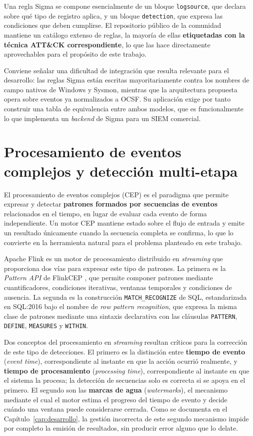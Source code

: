 Una regla Sigma se compone esencialmente de un bloque \texttt{logsource}, que declara sobre
qué tipo de registro aplica, y un bloque \texttt{detection}, que expresa las condiciones que
deben cumplirse. El repositorio público de la comunidad mantiene un catálogo extenso de
reglas, la mayoría de ellas \textbf{etiquetadas con la técnica ATT\&CK correspondiente}, lo
que las hace directamente aprovechables para el propósito de este trabajo.

Conviene señalar una dificultad de integración que resulta relevante para el desarrollo: las
reglas Sigma están escritas mayoritariamente contra los nombres de campo nativos de Windows
y Sysmon, mientras que la arquitectura propuesta opera sobre eventos ya normalizados a OCSF.
Su aplicación exige por tanto construir una tabla de equivalencia entre ambos modelos, que
es funcionalmente lo que implementa un \textit{backend} de Sigma para un SIEM comercial.

\section{Procesamiento de eventos complejos y detección multi-etapa}
\label{sec:cep}

El procesamiento de eventos complejos (CEP) es el paradigma que permite expresar y detectar
\textbf{patrones formados por secuencias de eventos} relacionados en el tiempo, en lugar de
evaluar cada evento de forma independiente. Un motor CEP mantiene estado sobre el flujo de
entrada y emite un resultado únicamente cuando la secuencia completa se confirma, lo que lo
convierte en la herramienta natural para el problema planteado en este trabajo.

Apache Flink \cite{flink} es un motor de procesamiento distribuido en \textit{streaming} que
proporciona dos vías para expresar este tipo de patrones. La primera es la
\textit{Pattern API} de FlinkCEP \cite{flinkcep}, que permite componer patrones mediante
cuantificadores, condiciones iterativas, ventanas temporales y condiciones de ausencia. La
segunda es la construcción \texttt{MATCH\_RECOGNIZE} de SQL, estandarizada en SQL:2016 bajo
el nombre de \textit{row pattern recognition}, que expresa la misma clase de patrones
mediante una sintaxis declarativa con las cláusulas \texttt{PATTERN}, \texttt{DEFINE},
\texttt{MEASURES} y \texttt{WITHIN}.

Dos conceptos del procesamiento en \textit{streaming} resultan críticos para la corrección
de este tipo de detecciones. El primero es la distinción entre \textbf{tiempo de evento}
(\textit{event time}), correspondiente al instante en que la acción ocurrió realmente, y
\textbf{tiempo de procesamiento} (\textit{processing time}), correspondiente al instante en
que el sistema la procesa; la detección de secuencias solo es correcta si se apoya en el
primero. El segundo son las \textbf{marcas de agua} (\textit{watermarks}), el mecanismo
mediante el cual el motor estima el progreso del tiempo de evento y decide cuándo una
ventana puede considerarse cerrada. Como se documenta en el Capítulo~\ref{cap:desarrollo},
la gestión incorrecta de este segundo mecanismo impide por completo la emisión de
resultados, sin producir error alguno que lo delate.

